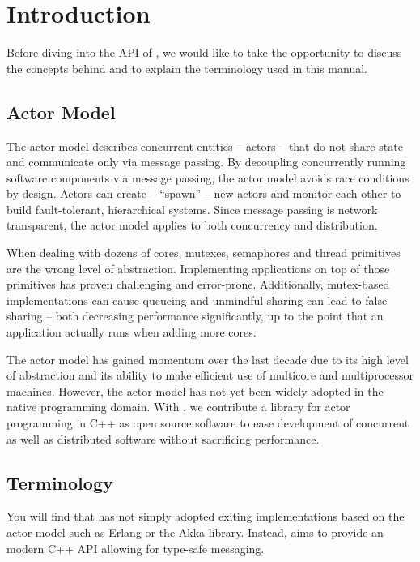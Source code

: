 \section{Introduction}

Before diving into the API of \libcppa, we would like to take the opportunity to discuss the concepts behind \libcppa and to explain the terminology used in this manual.

\subsection{Actor Model}

The actor model describes concurrent entities -- actors -- that do not share state and communicate only via message passing.
By decoupling concurrently running software components via message passing, the actor model avoids race conditions by design.
Actors can create -- ``spawn'' -- new actors and monitor each other to build fault-tolerant, hierarchical systems.
Since message passing is network transparent, the actor model applies to both concurrency and distribution.

When dealing with dozens of cores, mutexes, semaphores and thread primitives are the wrong level of abstraction.
Implementing applications on top of those primitives has proven challenging and error-prone.
Additionally, mutex-based implementations can cause queueing and unmindful sharing can lead to false sharing -- both decreasing performance significantly, up to the point that an application actually runs when adding more cores.

The actor model has gained momentum over the last decade due to its high level of abstraction and its ability to make efficient use of multicore and multiprocessor machines.
However, the actor model has not yet been widely adopted in the native programming domain.
With \libcppa, we contribute a library for actor programming in C++ as open source software to ease development of concurrent as well as distributed software without sacrificing performance.

\subsection{Terminology}

You will find that \libcppa has not simply adopted exiting implementations based on the actor model such as Erlang or the Akka library.
Instead, \libcppa aims to provide an modern C++ API allowing for type-safe messaging.


